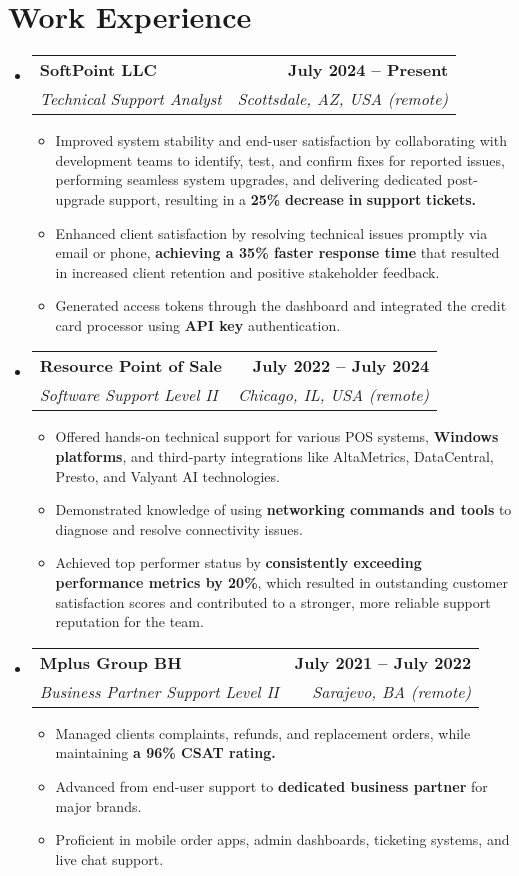 \documentclass[letterpaper,11pt]{article}
\makeatletter
\newcommand{\resumeItem}[1]{
  \item\small{
    {#1 \vspace{0pt}}
  }
}
\newcommand{\resumeSubheading}[4]{
  \vspace{-2pt}\item
    \begin{tabular*}{1.0\textwidth}[t]{l@{\extracolsep{\fill}}r}
      \textbf{#1} & \textbf{\small #2} \\
      \textit{\small#3} & \textit{\small #4} \\
    \end{tabular*}\vspace{-7pt}
}
\newcommand{\resumeSubHeadingListStart}{\begin{itemize}[leftmargin=0.0in, label={}]}
\newcommand{\resumeSubHeadingListEnd}{\end{itemize}}\vspace{0pt}
\newcommand{\resumeItemListStart}{\begin{itemize}}
\newcommand{\resumeItemListEnd}{\end{itemize}\vspace{-5pt}}
\makeatother
\begin{document}
\section{Work Experience}
    \resumeSubHeadingListStart
                \resumeSubheading{SoftPoint LLC}{July 2024 -- Present}{Technical Support Analyst}{Scottsdale, AZ, USA (remote)} 
                \resumeItemListStart
                    \resumeItem{Improved system stability and end-user satisfaction by collaborating with development teams to identify, test, and confirm fixes for reported issues, performing seamless system upgrades, and delivering dedicated post-upgrade support, resulting in a \textbf{25\%} \textbf{decrease} \textbf{in} \textbf{support} \textbf{tickets.}}
                    \resumeItem{Enhanced client satisfaction by resolving technical issues promptly via email or phone, \textbf{achieving a 35\% faster response time} that resulted in increased client retention and positive stakeholder feedback.}
                    \resumeItem{Generated access tokens through the dashboard and integrated the credit card processor using \textbf{API key} authentication.}
                    \resumeItemListEnd
            \resumeSubheading{Resource Point of Sale}{July 2022 -- July 2024}{Software Support Level II}{Chicago, IL, USA (remote)} 
                \resumeItemListStart
                    \resumeItem{Offered hands-on technical support for various POS systems, \textbf{Windows platforms}, and third-party integrations like AltaMetrics, DataCentral, Presto, and Valyant AI technologies.}
                    \resumeItem{Demonstrated knowledge of using \textbf{networking commands and tools} to diagnose and resolve connectivity issues.}
                    \resumeItem{Achieved top performer status by \textbf{consistently exceeding performance metrics by 20\%}, which resulted in outstanding customer satisfaction scores and contributed to a stronger, more reliable support reputation for the team.}
                    \resumeItemListEnd
            \resumeSubheading{Mplus Group BH}{July 2021 -- July 2022}{Business Partner Support Level II}{Sarajevo, BA (remote)}
                \resumeItemListStart
                    \resumeItem{Managed clients complaints, refunds, and replacement orders, while maintaining \textbf{a 96\% CSAT rating.}}
                    \resumeItem{Advanced from end-user support to \textbf{dedicated business partner} for major brands.}
                    \resumeItem{Proficient in mobile order apps, admin dashboards, ticketing systems, and live chat support.}
                    \resumeItemListEnd
    \resumeSubHeadingListEnd
    \vspace{-12pt}
\end{document}
